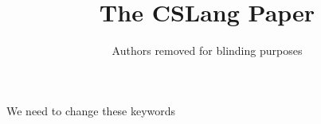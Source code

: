 \documentclass{IEEEtran}
\begin{document}
\title{The CSLang Paper}


\newcommand{\showurlx}{[redacted]}

\author{Authors removed for blinding purposes}


\maketitle


\begin{IEEEkeywords}
  We need to change these keywords
\end{IEEEkeywords}











\end{document}
